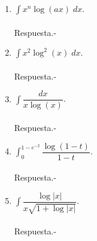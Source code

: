 \begin{enumerate}[\bfseries 1.]
    \item $\displaystyle\int x^n \log(ax)\; dx$.\\\\
	Respuesta.-\; 

    \item $\displaystyle\int x^2\log^2(x)\; dx$.\\\\
	Respuesta.-\; 

    \item $\displaystyle\int \dfrac{dx}{x\log(x)}$.\\\\
	Respuesta.-\;

    \item $\displaystyle\int_0^{1-e^{-2}} \dfrac{\log(1-t)}{1-t}$.\\\\
	Respuesta.-\;

    \item $\displaystyle\int \dfrac{\log|x|}{x\sqrt{1+\log|x|}}$.\\\\
	Respuesta.-\;


\end{enumerate}

